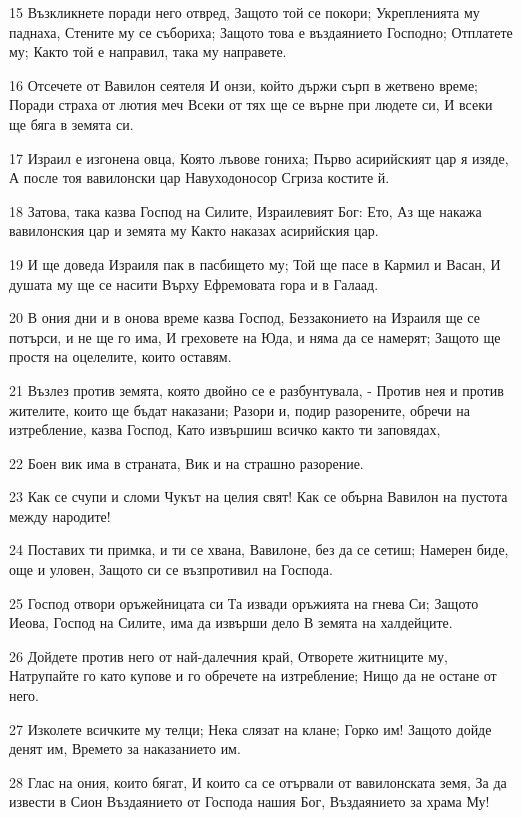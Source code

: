 \par 15 Възкликнете поради него отвред, Защото той се покори; Укрепленията му паднаха, Стените му се събориха; Защото това е въздаянието Господно; Отплатете му; Както той е направил, така му направете.
\par 16 Отсечете от Вавилон сеятеля И онзи, който държи сърп в жетвено време; Поради страха от лютия меч Всеки от тях ще се върне при людете си, И всеки ще бяга в земята си.
\par 17 Израил е изгонена овца, Която лъвове гониха; Първо асирийският цар я изяде, А после тоя вавилонски цар Навуходоносор Сгриза костите й.
\par 18 Затова, така казва Господ на Силите, Израилевият Бог: Ето, Аз ще накажа вавилонския цар и земята му Както наказах асирийския цар.
\par 19 И ще доведа Израиля пак в пасбището му; Той ще пасе в Кармил и Васан, И душата му ще се насити Върху Ефремовата гора и в Галаад.
\par 20 В ония дни и в онова време казва Господ, Беззаконието на Израиля ще се потърси, и не ще го има, И греховете на Юда, и няма да се намерят; Защото ще простя на оцелелите, които оставям.
\par 21 Възлез против земята, която двойно се е разбунтувала, - Против нея и против жителите, които ще бъдат наказани; Разори и, подир разорените, обречи на изтребление, казва Господ, Като извършиш всичко както ти заповядах,
\par 22 Боен вик има в страната, Вик и на страшно разорение.
\par 23 Как се счупи и сломи Чукът на целия свят! Как се обърна Вавилон на пустота между народите!
\par 24 Поставих ти примка, и ти се хвана, Вавилоне, без да се сетиш; Намерен биде, още и уловен, Защото си се възпротивил на Господа.
\par 25 Господ отвори оръжейницата си Та извади оръжията на гнева Си; Защото Иеова, Господ на Силите, има да извърши дело В земята на халдейците.
\par 26 Дойдете против него от най-далечния край, Отворете житниците му, Натрупайте го като купове и го обречете на изтребление; Нищо да не остане от него.
\par 27 Изколете всичките му телци; Нека слязат на клане; Горко им! Защото дойде денят им, Времето за наказанието им.
\par 28 Глас на ония, които бягат, И които са се отървали от вавилонската земя, За да извести в Сион Въздаянието от Господа нашия Бог, Въздаянието за храма Му!
